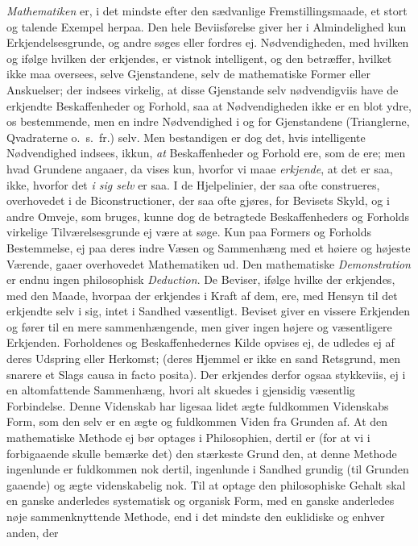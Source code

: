 \documentclass[12pt,a4paper]{book}
\newcommand{\apage}[1]{\marginnote{\footnotesize\textit{[#1]}}}
\begin{document}
\emph{Mathematiken} er, i det mindste efter den sædvanlige Fremstillingsmaade, et
stort og talende Exempel herpaa. Den hele Beviisførelse giver her i Almindelighed
kun Erkjendelsesgrunde, og andre søges eller fordres ej. Nødvendigheden, med
hvilken og ifølge hvilken der erkjendes, er vistnok intelligent, og den betræffer,
hvilket ikke maa oversees, selve Gjenstandene, selv de mathematiske Former eller
Anskuelser; der indsees virkelig, at disse Gjenstande selv nødvendigviis have de
erkjendte Beskaffenheder og Forhold, saa at Nødvendigheden ikke er en blot ydre,
os bestemmende, men en indre Nødvendighed i og for Gjenstandene (Trianglerne,
Qvadraterne o.\ s.\ fr.) selv. Men bestandigen er dog det, hvis intelligente
Nødvendighed indsees, ikkun, \emph{at} Beskaffenheder og Forhold ere, som de ere; men
hvad Grundene angaaer, da vises kun, hvorfor vi maae \emph{erkjende}, at det er
saa, ikke, hvorfor det \emph{i sig selv} er saa. I de Hjelpelinier, der saa ofte
construeres, overhovedet i de Biconstructioner, der saa ofte gjøres, for \apage{78} Bevisets
Skyld, og i andre Omveje, som bruges, kunne dog de betragtede Beskaffenheders og
Forholds virkelige Tilværelsesgrunde ej være at søge. Kun paa Formers og Forholds
Bestemmelse, ej paa deres indre Væsen og Sammenhæng med et høiere og højeste
Værende, gaaer overhovedet Mathematiken ud. Den mathematiske \emph{Demonstration}
er endnu ingen philosophisk \emph{Deduction}. De Beviser, ifølge hvilke der
erkjendes, med den Maade, hvorpaa der erkjendes i Kraft af dem, ere, med Hensyn
til det erkjendte selv i sig, intet i Sandhed væsentligt. Beviset giver en vissere
Erkjenden og fører til en mere sammenhængende, men giver ingen højere og
væsentligere Erkjenden. Forholdenes og Beskaffenhedernes Kilde opvises ej, de
udledes ej af deres Udspring eller Herkomst; (deres Hjemmel er ikke en sand
Retsgrund, men snarere et Slags causa in facto posita). Der erkjendes derfor ogsaa
stykkeviis, ej i en altomfattende Sammenhæng, hvori alt skuedes i gjensidig
væsentlig Forbindelse. Denne Videnskab har ligesaa lidet ægte fuldkommen
Videnskabs Form, som den selv er en ægte og fuldkommen Viden fra Grunden af. At
den mathematiske Methode ej bør optages i Philosophien, dertil er (for at vi i
forbigaaende skulle bemærke det) den stærkeste Grund den, at denne Methode
ingenlunde er fuldkommen nok dertil, ingenlunde i Sandhed grundig (til Grunden \apage{79} 
gaaende) og ægte videnskabelig nok. Til at optage den philosophiske Gehalt skal
en ganske anderledes systematisk og organisk Form, med en ganske anderledes nøje
sammenknyttende Methode, end i det mindste den euklidiske og enhver anden, der
\end{document}
